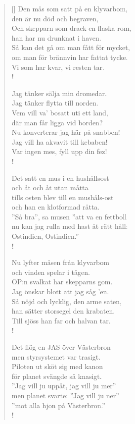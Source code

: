 \documentclass[11pt, a4paper]{memoir} %
\begin{document}
\begin{verse}[\versewidth]
Den mås som satt på en klyvarbom,\\
den är nu död och begraven,\\
Och skepparn som drack en flaska rom,\\
han har nu drunknat i haven.\\
Så kan det gå om man fått för mycket,\\
om man för brännvin har fattat tycke.\\
Vi som har kvar, vi resten tar.\\!

Jag tänker sälja min dromedar. \\
Jag tänker flytta till norden. \\
Vem vill va’ bosatt uti ett land, \\
där man får ligga vid borden? \\
Nu konverterar jag här på snabben! \\
Jag vill ha akvavit till kebaben! \\
Var ingen mes, fyll upp din fez! \\!

Det satt en mus i en hushållsost \\
och åt och åt utan måtta \\
tills osten blev till en mushåls-ost \\
och han en klotformad råtta. \\
''Så bra'', sa musen ''att va en fettboll \\
nu kan jag rulla med hast åt rätt håll: \\
Ostindien, Ostindien.'' \\!

Nu lyfter måsen från klyvarbom\\
och vinden spelar i tågen.\\
OP:n svalkat har skepparns gom.\\
Jag önskar blott att jag såg ’en.\\
Så nöjd och lycklig, den arme saten,\\
han sätter storsegel den krabaten.\\
Till sjöss han far och halvan tar.\\!

Det flög en JAS över Västerbron \\
men styrsystemet var trasigt. \\
Piloten ut sköt sig med kanon \\
för planet svängde så knasigt. \\
''Jag vill ju uppåt, jag vill ju mer''\\ 
men planet svarte: ''Jag vill ju ner'' \\
''mot alla hjon på Västerbron.'' \\!


\end{verse}
\end{document}
